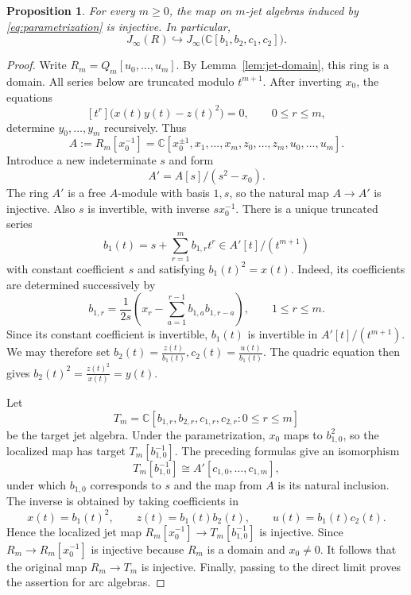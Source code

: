 \documentclass[11pt]{amsart}
\newtheorem{proposition}[theorem]{Proposition}
\theoremstyle{definition}
\theoremstyle{remark}
\newcommand{\C}{\mathbb C}
\newcommand{\J}{J_\infty}
\begin{document}
\begin{proposition}\label{prop:arc-injection}
For every $m\geq0$, the map on $m$-jet algebras induced by
\eqref{eq:parametrization} is injective. In particular,
\[
 \J(R)\hookrightarrow\J\bigl(\C[b_1,b_2,c_1,c_2]\bigr).
\]
\end{proposition}
\begin{proof}
Write $R_m=Q_m[u_0,\ldots,u_m]$. By
Lemma~\ref{lem:jet-domain}, this ring is a domain.
All series below are truncated modulo $t^{m+1}$.
After inverting $x_0$, the equations
\[
 [t^r]\bigl(x(t)y(t)-z(t)^2\bigr)=0,
 \qquad 0\le r\le m,
\]
determine $y_0,\ldots,y_m$ recursively. Thus
\[
 A:=R_m[x_0^{-1}]
 =
 \mathbb C[x_0^{\pm1},x_1,\ldots,x_m,
           z_0,\ldots,z_m,u_0,\ldots,u_m].
\]
Introduce a new indeterminate $s$ and form
\[
 A'=A[s]/(s^2-x_0).
\]
The ring $A'$ is a free $A$-module with basis $1,s$,
so the natural map $A\longrightarrow A'$ is injective.
Also $s$ is invertible, with inverse $s x_0^{-1}$.
There is a unique truncated series
\[
 b_1(t)=s+\sum_{r=1}^{m}b_{1,r}t^r
 \in A'[t]/(t^{m+1})
\]
with constant coefficient $s$ and satisfying
$b_1(t)^2=x(t)$.
Indeed, its coefficients are determined successively by
\[
 b_{1,r}
 =
 \frac{1}{2s}
 \left(x_r-\sum_{a=1}^{r-1}b_{1,a}b_{1,r-a}\right),
 \qquad 1\le r\le m.
\]
Since its constant coefficient is invertible, $b_1(t)$
is invertible in $A'[t]/(t^{m+1})$. We may therefore set
$
 b_2(t)=\frac{z(t)}{b_1(t)},
 c_2(t)=\frac{u(t)}{b_1(t)}.
$
The quadric equation then gives
$
 b_2(t)^2=\frac{z(t)^2}{x(t)}=y(t).
$

Let
\[
 T_m=
 \mathbb C[b_{1,r},b_{2,r},c_{1,r},c_{2,r}:0\le r\le m]
\]
be the target jet algebra. Under the parametrization,
$x_0$ maps to $b_{1,0}^2$, so the localized map has target
$T_m[b_{1,0}^{-1}]$.
The preceding formulas give an isomorphism
\[
 T_m[b_{1,0}^{-1}]
 \cong A'[c_{1,0},\ldots,c_{1,m}],
\]
under which $b_{1,0}$ corresponds to $s$ and the map from
$A$ is its natural inclusion. The inverse is obtained
by taking coefficients in
\[
 x(t)=b_1(t)^2,\qquad
 z(t)=b_1(t)b_2(t),\qquad
 u(t)=b_1(t)c_2(t).
\]
Hence the localized jet map $R_m[x_0^{-1}] \rightarrow T_m[b_{1,0}^{-1}]$ is injective.
Since $R_m\longrightarrow R_m[x_0^{-1}]$ is injective
because $R_m$ is a domain and $x_0\ne0$.
It follows that the original map $R_m\longrightarrow T_m$
is injective. Finally, passing to the direct limit proves the
assertion for arc algebras.
\end{proof}
\end{document}
